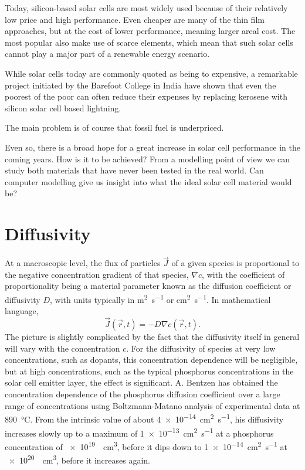 \documentclass[11pt]{scrbook}   %
\begin{document}
Today, silicon-based solar cells are most widely used because of their
relatively low price and high performance. Even cheaper are many of the thin
film approaches, but at the cost of lower performance, meaning larger areal
cost. The most popular also make use of scarce elements, which mean that such
solar cells cannot play a major part of a renewable energy scenario.

While solar cells today are commonly quoted as being to expensive, a remarkable
project initiated by the Barefoot College in India have shown that even the
poorest of the poor can often reduce their expenses by replacing kerosene with
silicon solar cell based lightning.

The main problem is of course that fossil fuel is underpriced.

Even so, there is a broad hope for a great increase in solar cell performance in
the coming years. How is it to be achieved? From a modelling point of view we
can study both materials that have never been tested in the real world. Can
computer modelling give us insight into what the ideal solar cell material would
be?


\section{Diffusivity}

At a macroscopic level, the flux of particles $\vec{J}$ of a given species is proportional to the negative concentration gradient of that species, $\nabla c$, with the coefficient of proportionality being a material parameter known as the diffusion coefficient or diffusivity $D$, with units typically in \si{\metre\squared\per\second} or \si{\centi\metre\squared\per\second}.
In mathematical language,
\begin{equation}
  \vec{J}(\vec{r},t) = - D \nabla c(\vec{r},t).
\end{equation}
The picture is slightly complicated by the fact that the diffusivity itself in general will vary with the concentration $c$.
For the diffusivity of species at very low concentrations, such as dopants, this concentration dependence will be negligible, but at high concentrations, such as the typical phosphorus concentrations in the solar cell emitter layer, the effect is significant.
A. Bentzen has obtained the concentration dependence of the phosphorus diffusion coefficient over a large range of concentrations using Boltzmann-Matano analysis of experimental data at \SI{890}{\celsius}. 
From the intrinsic value of about \SI{4e-14}{\centi\metre\squared\per\second}, his diffusivity increases slowly up to a maximum of \SI{1e-13}{\centi\metre\squared\per\second} at a phosphorus concentration of \SI{e19}{\per\centi\metre\cubed}, before it dips down to \SI{1e-14}{\centi\metre\squared\per\second} at \SI{e20}{\per\centi\metre\cubed}, before it increases again.\cite{Bentzen:2006}
\end{document}
